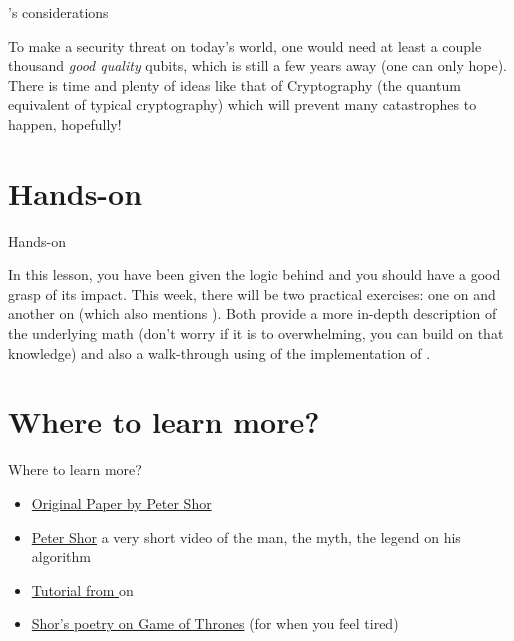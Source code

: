 \documentclass[aspectratio=43]{beamer}
\begin{document}
\begin{frame}{\sa's considerations}
    \begin{card}
        To make \sa a security threat on today's world, one would need at least a couple thousand \textit{good quality} qubits, which is still a few years away (one can only hope). There is time and plenty of ideas like that of \q Cryptography (the quantum equivalent of typical cryptography) which will prevent many catastrophes to happen, hopefully!
    \end{card}
\pagenumber
\end{frame}

\section{Hands-on}
\begin{frame}{Hands-on}
    \begin{card}
        In this lesson, you have been given the logic behind \sa and you should have a good grasp of its impact. This week, there will be two practical exercises: one on \qft and another on \sa (which also mentions \qft). Both provide a more in-depth description of the underlying math (don't worry if it is to overwhelming, you can build on that knowledge) and also a walk-through using \qk of the implementation of \sa.
    \end{card}
\pagenumber
\end{frame}




\section{Where to learn more?}
\begin{frame}{Where to learn more?}
\begin{card}
    \begin{itemize}
        \item \href{https://arxiv.org/abs/quant-ph/9508027}{Original Paper by Peter Shor}
        \item \href{https://www.youtube.com/watch?v=hOlOY7NyMfs}{Peter Shor} a very short video of the man, the myth, the legend on his algorithm
        \item \href{https://quantumexperience.ng.bluemix.net/proxy/tutorial/full-user-guide/004-Quantum_Algorithms/110-Shor's_algorithm.html}{Tutorial from \ibmqe} on \sa
        \item \href{http://www-math.mit.edu/~shor/GRRM-poetry.html}{Shor's poetry on Game of Thrones} (for when you feel tired)
    \end{itemize}
\end{card}
\end{frame}
\end{document}
